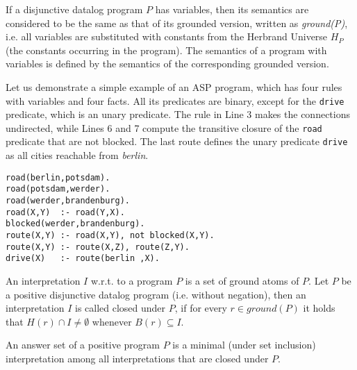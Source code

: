 If a disjunctive datalog program $P$ has variables, then its semantics are considered to be the same as that of its grounded version, written as \textit{ground(P)}, i.e. all variables are substituted with constants from the Herbrand Universe $H_P$ (the constants occurring in the program). The semantics of a program with variables is defined by the semantics of the corresponding grounded version.

\begin{example}
Let us demonstrate a simple example of an ASP program, which has four rules with variables and four facts. All its predicates are binary, except for the \texttt{drive} predicate, which is an unary predicate. The rule in Line 3 makes the connections undirected, while Lines 6 and 7 compute the transitive closure of the \texttt{road} predicate that are not blocked. The last route defines the unary predicate \texttt{drive} as all cities reachable from \textit{berlin}.
    \begin{lstlisting}[caption=An example of an ASP program (from \textcite{ASPbook}); demonstrate possible route calculations for train connections around Berlin, label=lst:example_asp_program,basicstyle=\ttfamily]
road(berlin,potsdam).
road(potsdam,werder).
road(werder,brandenburg).
road(X,Y)  :- road(Y,X).
blocked(werder,brandenburg).
route(X,Y) :- road(X,Y), not blocked(X,Y).
route(X,Y) :- route(X,Z), route(Z,Y).
drive(X)   :- route(berlin ,X).
\end{lstlisting}
\end{example}

An interpretation $I$ w.r.t. to a program $P$ is a set of ground atoms of $P$. Let $P$ be a positive disjunctive datalog program (i.e. without negation), then an interpretation $I$ is called closed under $P$, if for every $r \in \textit{ground}(P)$ it holds that $H(r) \cap I \ne \emptyset$ whenever $B(r) \subseteq I$. 
\begin{definition}
An answer set of a positive program $P$ is a minimal (under set inclusion) interpretation among all interpretations that are closed under $P$.
\end{definition}

